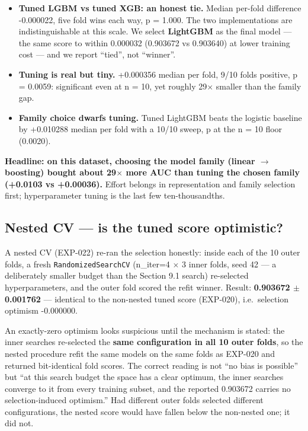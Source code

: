 \documentclass[11pt,a4paper]{article}
\providecommand{\tightlist}{\setlength{\itemsep}{2pt}\setlength{\parskip}{0pt}}
\begin{document}
{\begin{itemize}
\tightlist
\item
  \textbf{Tuned LGBM vs tuned XGB: an honest tie.} Median per-fold difference -0.000022, five fold wins each way, p = 1.000. The two implementations are indistinguishable at this scale. We select \textbf{LightGBM} as the final model --- the same score to within 0.000032 (0.903672 vs 0.903640) at lower training cost --- and we report ``tied'', not ``winner''.
\item
  \textbf{Tuning is real but tiny.} +0.000356 median per fold, 9/10 folds positive, p = 0.0059: significant even at n = 10, yet roughly 29$\times$ smaller than the family gap.
\item
  \textbf{Family choice dwarfs tuning.} Tuned LightGBM beats the logistic baseline by +0.010288 median per fold with a 10/10 sweep, p at the n = 10 floor (0.0020).
\end{itemize}

\textbf{Headline: on this dataset, choosing the model family (linear $\rightarrow$ boosting) bought about 29$\times$ more AUC than tuning the chosen family (+0.0103 vs +0.00036).} Effort belongs in representation and family selection first; hyperparameter tuning is the last few ten-thousandths.

\subsection{Nested CV --- is the tuned score optimistic?}\label{nested-cv-is-the-tuned-score-optimistic}

A nested CV (EXP-022) re-ran the selection honestly: inside each of the 10 outer folds, a fresh \texttt{RandomizedSearchCV} (n\_iter=4 $\times$ 3 inner folds, seed 42 --- a deliberately smaller budget than the Section 9.1 search) re-selected hyperparameters, and the outer fold scored the refit winner. Result: \textbf{0.903672 $\pm$ 0.001762} --- identical to the non-nested tuned score (EXP-020), i.e.~selection optimism -0.000000.

An exactly-zero optimism looks suspicious until the mechanism is stated: the inner searches re-selected the \textbf{same configuration in all 10 outer folds}, so the nested procedure refit the same models on the same folds as EXP-020 and returned bit-identical fold scores. The correct reading is not ``no bias is possible'' but ``at this search budget the space has a clear optimum, the inner searches converge to it from every training subset, and the reported 0.903672 carries no selection-induced optimism.'' Had different outer folds selected different configurations, the nested score would have fallen below the non-nested one; it did not.

}
\end{document}
